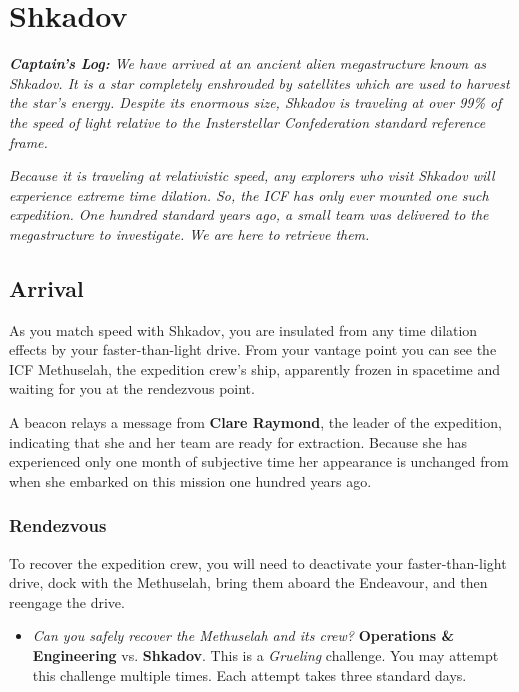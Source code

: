 \documentclass[11pt, a5paper, parskip=half-, DIV=12]{scrartcl}
\begin{document}
\section*{Shkadov}
\textit{\textbf{Captain's Log:} We have arrived at an ancient alien megastructure known as Shkadov. It is a star completely enshrouded by satellites which are used to harvest the star's energy. Despite its enormous size, Shkadov is traveling at over 99\% of the speed of light relative to the Insterstellar Confederation standard reference frame.}

\textit{Because it is traveling at relativistic speed, any explorers who visit Shkadov will experience extreme time dilation. So, the ICF has only ever mounted one such expedition. One hundred standard years ago, a small team was delivered to the megastructure to investigate. We are here to retrieve them.}

\subsection*{Arrival}
As you match speed with Shkadov, you are insulated from any time dilation effects by your faster-than-light drive. From your vantage point you can see the ICF Methuselah, the expedition crew's ship, apparently frozen in spacetime and waiting for you at the rendezvous point. 

A beacon relays a message from \textbf{Clare Raymond}, the leader of the expedition, indicating that she and her team are ready for extraction. Because she has experienced only one month of subjective time her appearance is unchanged from when she embarked on this mission one hundred years ago. 

\subsubsection*{Rendezvous}
To recover the expedition crew, you will need to deactivate your faster-than-light drive, dock with the Methuselah, bring them aboard the Endeavour, and then reengage the drive. 
\begin{itemize}
	\item \textit{Can you safely recover the Methuselah and its crew?} \textbf{Operations \& Engineering} vs. \textbf{Shkadov}. This is a \textit{Grueling} challenge. You may attempt this challenge multiple times. Each attempt takes three standard days.
\end{itemize}

\newpage
\end{document}
